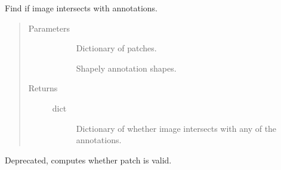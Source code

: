 \documentclass[letterpaper,10pt,english]{sphinxmanual}
\begin{document}
\begin{fulllineitems}
\label{\detokenize{index:pathflowai.utils.is_image_in_boxes}}
Find if image intersects with annotations.
\begin{quote}\begin{description}
\item[{Parameters}] \leavevmode\begin{description}
\item[{}] \leavevmode
Dictionary of patches.

\item[{}] \leavevmode
Shapely annotation shapes.

\end{description}

\item[{Returns}] \leavevmode\begin{description}
\item[{dict}] \leavevmode
Dictionary of whether image intersects with any of the annotations.

\end{description}

\end{description}\end{quote}

\end{fulllineitems}


\begin{fulllineitems}
\label{\detokenize{index:pathflowai.utils.is_valid_patch}}
Deprecated, computes whether patch is valid.

\end{fulllineitems}

\end{document}
